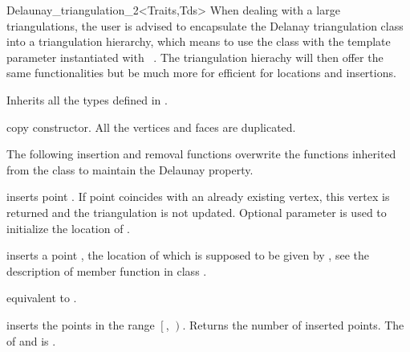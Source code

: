 \begin{ccRefClass}{Delaunay_triangulation_2<Traits,Tds>}
When dealing
with a large triangulations, the user is advised to 
encapsulate  the Delanay triangulation class into a
triangulation hierarchy, which means to use  the class
with the template parameter instantiated with \ccRefName\ .
The triangulation hierachy will then  offer the same 
functionalities  but be much more for efficient 
for locations and insertions.



\ccInheritsFrom


\ccTypes
Inherits all the types defined in  .

\ccCreation
{}  %


{copy constructor. All the vertices and faces are duplicated.}


The following insertion and removal  functions overwrite
the functions inherited from the class
 to maintain the Delaunay property.




{inserts  point .
If point  coincides with an already existing vertex, this 
vertex is returned and the triangulation is not updated.
Optional parameter  is used to initialize the location of .
}

{ inserts a point , the location of which is supposed to be
given by , see the description of member function
 in class .}

{equivalent to .}

{inserts the points in the range
 $\left[\right.$, $\left.\right)$.
 Returns the number of inserted points.
 \ccPrecond The  of  and 
 is .}




\end{ccRefClass}
